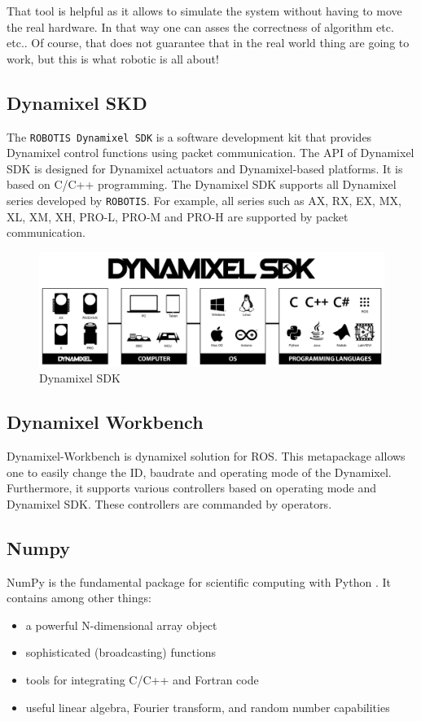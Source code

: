 That tool is helpful as it allows to simulate the system without having to move the real hardware. In that way one can asses the correctness of algorithm etc. etc.. Of course, that does not guarantee that in the real world thing are going to work, but this is what robotic is all about!

\subsection{Dynamixel SKD}
The \texttt{ROBOTIS Dynamixel SDK} is a software development kit that provides Dynamixel control functions using packet communication. The API of Dynamixel SDK is designed for Dynamixel actuators and Dynamixel-based platforms. It is based on C/C++ programming. The Dynamixel SDK supports all Dynamixel series developed by \texttt{ROBOTIS}. For example, all series such as AX, RX, EX, MX, XL, XM, XH, PRO-L, PRO-M and PRO-H are supported by packet communication.
\begin{figure}
	\centering
	\includegraphics[width=\textwidth]{img/sdk.jpg}%
	\caption{Dynamixel SDK}
	\label{fig:dynamixelSDK}
\end{figure}

\subsection{Dynamixel Workbench}
Dynamixel-Workbench is dynamixel solution for ROS. This metapackage allows one to easily change the ID, baudrate and operating mode of the Dynamixel. Furthermore, it supports various controllers based on operating mode and Dynamixel SDK. These controllers are commanded by operators.


\subsection{Numpy}
NumPy is the fundamental package for scientific computing with Python \cite{numpy}. It contains among other things:
\begin{itemize}
    \item a powerful N-dimensional array object
    \item sophisticated (broadcasting) functions
    \item tools for integrating C/C++ and Fortran code
    \item useful linear algebra, Fourier transform, and random number capabilities
\end{itemize}

